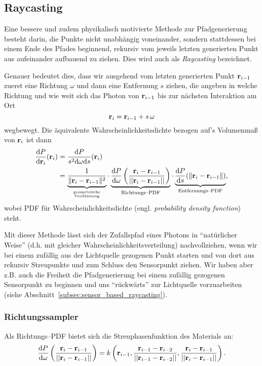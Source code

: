 	\subsection{Raycasting}
	Eine bessere und zudem physikalisch motivierte Methode zur Pfadgenerierung besteht darin, die Punkte nicht unabhängig voneinander, sondern stattdessen bei einem Ende des Pfades beginnend, rekursiv vom jeweils letzten generierten Punkt aus aufeinander aufbauend zu ziehen. Dies wird auch als {\em Raycasting} bezeichnet.
	
	Genauer bedeutet dies, dass wir ausgehend vom letzten generierten Punkt $\mathbf{r}_{i-1}$ zuerst eine Richtung $\omega$ und dann eine Entfernung $s$ ziehen, die angeben in welche Richtung und wie weit sich das Photon von $\mathbf{r}_{i-1}$ bis zur nächsten Interaktion am Ort
	$$\mathbf{r}_i=\mathbf{r}_{i-1}+s\,\omega$$
	wegbewegt.
	Die äquivalente Wahrscheinlichkeitsdichte bezogen auf's Volumenmaß von $\mathbf{r}_i$ ist dann
	\begin{align*}
		\frac{\text{d}P}{\text{d}\mathbf{r}_i}(\mathbf{r}_i) &= \frac{\text{d}P}{s^2 \text{d}\omega\text{d}s}(\mathbf{r}_i) \\
		&= \underbrace{\frac{1}{\|\mathbf{r}_i - \mathbf{r}_{i-1}\|^2}}_{\text{geometrische}\atop\text{Verdünnung}} \cdot\underbrace{\frac{\text{d}P}{\text{d}\omega}\left(\frac{\mathbf{r}_i - \mathbf{r}_{i-1}}{||\mathbf{r}_i - \mathbf{r}_{i-1}||}\right)}_{\text{Richtungs--PDF}} \cdot \underbrace{\frac{\text{d}P}{\text{d}s}(\|\mathbf{r}_i-\mathbf{r}_{i-1}\|)}_{\text{Entfernungs--PDF}},
	\end{align*}
	wobei PDF für Wahrscheinlichkeitsdichte (engl. {\em probability density function}) steht.
	
	Mit dieser Methode lässt sich der Zufallspfad eines Photons in ``natürlicher Weise'' (d.h. mit gleicher Wahrscheinlichkeitsverteilung) nachvollziehen, wenn wir bei einem zufällig aus der Lichtquelle gezogenen Punkt starten und von dort aus rekursiv Streupunkte und zum Schluss den Sensorpunkt ziehen. Wir haben aber z.B. auch die Freiheit die Pfadgenerierung bei einem zufällig gezogenen Sensorpunkt zu beginnen und uns ``rückwärts'' zur Lichtquelle vorzuarbeiten (siehe Abschnitt~\ref{subsec:sensor_based_raycasting}).
	
	\subsubsection{Richtungssampler}
	Als Richtungs--PDF bietet sich die Streuphasenfunktion des Materials an:
	\begin{equation*}
		\frac{\text{d}P}{\text{d}\omega}\left(\frac{\mathbf{r}_i - \mathbf{r}_{i-1}}{||\mathbf{r}_i - \mathbf{r}_{i-1}||}\right) = k\left(\mathbf{r}_{i-1},\frac{\mathbf{r}_{i-1} - \mathbf{r}_{i-2}}{||\mathbf{r}_{i-1} - \mathbf{r}_{i-2}||},\frac{\mathbf{r}_i - \mathbf{r}_{i-1}}{||\mathbf{r}_i - \mathbf{r}_{i-1}||}\right).
		\label{eq:direction_pdf}
	\end{equation*}
	
